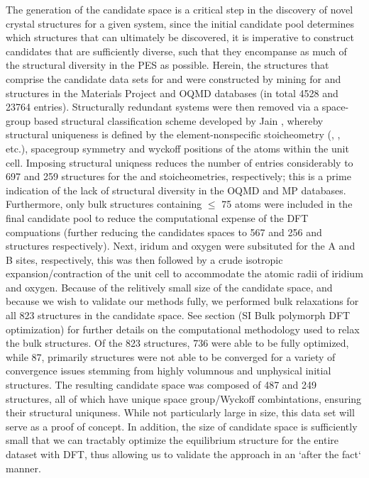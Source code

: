 %
The generation of the candidate space is a critical step in the discovery of novel crystal structures for a given system,
since the initial candidate pool determines which structures that can ultimately be discovered, it is imperative to construct candidates that are sufficiently diverse, such that they encompanse as much of the structural diversity in the PES as possible.
%
Herein, the structures that comprise the candidate data sets for \IrOtwo and \IrOthree were constructed by mining for \ABtwo and \ABthree structures in the Materials Project\cite{Jain2013} and OQMD\cite{Kirklin2015} databases
(in total 4528 \ABtwo and 23764 \ABthree entries).
%
Structurally redundant systems were then removed via a space-group based structural classification scheme developed by Jain  \cite{Jain2018},
whereby structural uniqueness is defined by the element-nonspecific stoicheometry (\ABtwo, \ABthree, etc.), spacegroup symmetry and wyckoff positions of the atoms within the unit cell.
%
Imposing structural uniqness reduces the number of entries considerably to 697 and 259 structures for the \ABtwo and \ABthree stoicheometries, respectively;
this is a prime indication of the lack of structural diversity in the OQMD and MP databases.
%
Furthermore, only bulk structures containing $\leq$ 75 atoms were included in the final candidate pool to reduce the computational expense of the DFT compuations
(further reducing the candidates spaces to 567 and 256 \ABtwo and \ABthree structures respectively).
%
Next, iridum and oxygen were subsituted for the A and B sites, respectively,
this was then followed by a crude isotropic expansion/contraction of the unit cell to accommodate the atomic radii of iridium and oxygen.
%
Because of the relitively small size of the candidate space, and because we wish to validate our methods fully, we performed bulk relaxations for all 823 structures in the candidate space.
%
See section (SI Bulk polymorph DFT optimization) for further details on the computational methodology used to relax the bulk structures.
%
Of the 823 structures, 736 were able to be fully optimized, while 87, primarily \ABtwo structures were not able to be converged for a variety of convergence issues stemming from highly volumnous and unphysical initial structures.
%
The resulting candidate space was composed of 487 \IrOtwo and 249 \IrOthree structures, all of which have unique space group/Wyckoff combintations, ensuring their structural uniquness.
%
While not particularly large in size, this data set will serve as a proof of concept.
%
In addition, the size of candidate space is sufficiently small that we can tractably optimize the equilibrium structure for the entire dataset with  DFT, thus allowing us to validate the approach in an `after the fact` manner.


